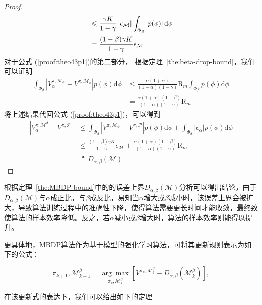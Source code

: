 \begin{proof}
\begin{align}
&\leq \frac{\gamma K}{1-\gamma}\left|\epsilon_{\mathcal{M}}\right|\int_{\Phi_\beta}\left|p(\phi)\right|\mathrm{d}\phi\notag\\
&=\frac{(1-\beta)\gamma K}{1-\gamma}\epsilon_{\mathcal{M}} \label{proof:theo43p2}
\end{align}
对于公式 (\ref{proof:theo43p1})的第二部分， 根据定理~\ref{the:beta-drop-bound}，我们可以证明
\begin{align}
\int_{\Phi_\beta}\left|{V}_\alpha^{\pi, \mathcal{M}_{\phi}} - {V}^{\pi,\mathcal{M}_{\phi}}\right|p(\phi)\mathrm{d}\phi&\leq \frac{\alpha(1+\alpha)}{(1-\alpha)(1-\gamma)}\mathrm{R}_m\int_{\Phi_\beta}p(\phi)\mathrm{d}\phi\\
&=\frac{\alpha(1+\alpha)(1-\beta)}{(1-\alpha)(1-\gamma)}\mathrm{R}_m \label{proof:theo43p3}
\end{align}
将上述结果代回公式 (\ref{proof:theo43p1})，可以得到
\begin{align*}
\left|{V}_\alpha^{\pi, \mathcal{M}^\beta}-{V}^{\pi, \mathcal{P}}\right| &\leq \int_{\Phi_\beta}\left|{V}^{\pi, \mathcal{M}_{\phi}}-{V}^{\pi, \mathcal{P}}\right|p(\phi)\mathrm{d}\phi+\int_{\Phi_\beta}\left|\epsilon_\alpha\right|p(\phi)\mathrm{d}\phi\\
&\leq \frac{(1-\beta)\gamma K}{1-\gamma}\epsilon_{\mathcal{M}}+\frac{\alpha(1+\alpha)(1-\beta)}{(1-\alpha)(1-\gamma)}\mathrm{R}_m\\
&\triangleq D_{\alpha,\beta}(\mathcal{M})
\end{align*}

\end{proof}

根据定理~\ref{the:MBDP-bound}中的的误差上界$D_{\alpha,\beta}(\mathcal{M})$分析可以得出结论，由于$D_{\alpha,\beta}(\mathcal{M})$与$\alpha$成正比，与$\beta$成反比，易知当$\alpha$增大或$\beta$减小时，该误差上界会被扩大，导致算法训练过程中的准确性下降，使得算法需要更长时间才能收敛，最终致使算法的样本效率降低。反之，若$\alpha$减小或$\beta$增大时，算法的样本效率则能得以提升。

更具体地，MBDP算法作为基于模型的强化学习算法，可将其更新规则表示为如下的公式：

\begin{equation}
    \pi_{k+1}, \mathcal{M}^\beta_{k+1}=\underset{\pi_k, \mathcal{M}_k^\beta}{\arg\max}\left[{V}^{\pi_k, \mathcal{M}_k^\beta}-D_{\alpha,\beta}(\mathcal{M}^\beta_k)\right],
\label{eq:algo-equation}
\end{equation}

在该更新式的表达下，我们可以给出如下的定理

